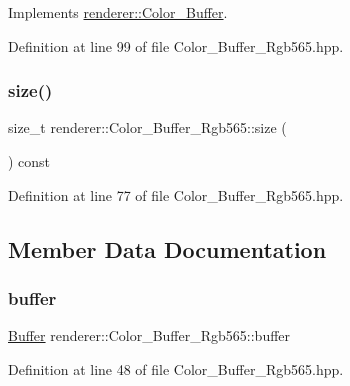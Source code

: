 Implements \mbox{\hyperlink{classrenderer_1_1_color___buffer_a02e8a2b93f5d95f10e2aedd24ee02625}{renderer\+::\+Color\+\_\+\+Buffer}}.



Definition at line 99 of file Color\+\_\+\+Buffer\+\_\+\+Rgb565.\+hpp.

\mbox{\label{classrenderer_1_1_color___buffer___rgb565_a0bb8eba0bf02fdc13fe8e1c67906631e}} 
\subsubsection{\texorpdfstring{size()}{size()}}
{\footnotesize\ttfamily size\+\_\+t renderer\+::\+Color\+\_\+\+Buffer\+\_\+\+Rgb565\+::size (\begin{DoxyParamCaption}{ }\end{DoxyParamCaption}) const\hspace{0.3cm}{\ttfamily [inline]}}



Definition at line 77 of file Color\+\_\+\+Buffer\+\_\+\+Rgb565.\+hpp.



\subsection{Member Data Documentation}
\mbox{\label{classrenderer_1_1_color___buffer___rgb565_af8e027cd7b139e5f795001db42c84058}} 
\subsubsection{\texorpdfstring{buffer}{buffer}}
{\footnotesize\ttfamily \mbox{\hyperlink{classrenderer_1_1_color___buffer___rgb565_a60feae2b617049e32ecfb9e87349272c}{Buffer}} renderer\+::\+Color\+\_\+\+Buffer\+\_\+\+Rgb565\+::buffer\hspace{0.3cm}{\ttfamily [private]}}



Definition at line 48 of file Color\+\_\+\+Buffer\+\_\+\+Rgb565.\+hpp.

